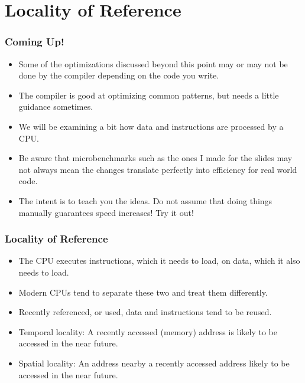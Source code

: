 \documentclass[11pt]{beamer}
\begin{document}
\section*{Locality of Reference}

\begin{frame}[plain]
    \frametitle{Coming Up!}
    \begin{itemize}
        \item<1-> Some of the optimizations discussed beyond this point may or may not be done by the compiler depending on the code you write.
        \item<2-> The compiler is good at optimizing common patterns, but needs a little guidance sometimes.
        \item<3-> We will be examining a bit how data and instructions are processed by a CPU.
        \item<4-> Be aware that microbenchmarks such as the ones I made for the slides may not always mean the changes translate perfectly into efficiency for real world code.
        \item<5-> The intent is to teach you the ideas. Do not assume that doing things manually guarantees speed increases! Try it out!
    \end{itemize}
\end{frame}

\begin{frame}[plain]
    \frametitle{Locality of Reference}
    \begin{itemize}
        \item<1-> The CPU executes instructions, which it needs to load, on data, which it also needs to load.
        \item<2-> Modern CPUs tend to separate these two and treat them differently.
        \item<3-> Recently referenced, or used, data and instructions tend to be reused.
        \item<4-> Temporal locality: A recently accessed (memory) address is likely to be accessed in the near future.
        \item<5-> Spatial locality: An address nearby a recently accessed address likely to be accessed in the near future.
    \end{itemize}
\end{frame}
\end{document}

